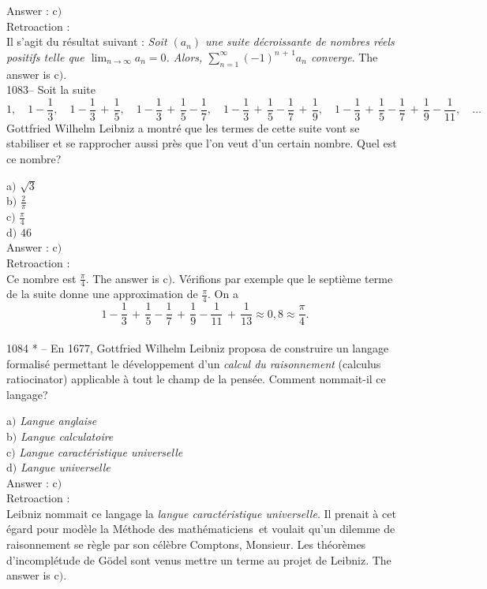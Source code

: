 ﻿\documentclass[letterpaper, 12pt]{article}
\begin{document}
Answer : c$)$\\

Retroaction : \\
Il s'agit du r\'esultat suivant : {\sl Soit $(a_n)$ une suite
d\'ecroissante de nombres r\'eels positifs telle que
$\lim_{n\to\infty}a_n=0$. Alors,
$\sum_{n=1}^{\infty}(-1)^{n\,+\,1}a_n$ converge}.
The answer is c$)$.\\

1083-- Soit la suite
$$\displaystyle{1,\quad1-\frac13,\quad1-\frac13\,+\,\frac15,\quad1-\frac13\,+\,\frac15-\frac17,\quad1-\frac13\,+\,\frac15-\frac17\,+\,\frac19,\quad
1-\frac13\,+\,\frac15-\frac17\,+\,\frac19-\frac1{11},\quad\ldots}$$
Gottfried Wilhelm Leibniz a montr\'e que les termes de cette suite
vont se stabiliser et se rapprocher aussi pr\`es que l'on veut d'un
certain nombre. Quel est ce nombre?

a$)$ $\sqrt3$ \\ [2mm] b$)$ $\frac2{\pi}$ \\ [2mm] c$)$
$\frac{\pi}4$ \\ [2mm]
d$)$ $46$\\

Answer : c$)$\\

Retroaction : \\
Ce nombre est $\frac{\pi}4$. The answer is c$)$. V\'erifions par
exemple que le septi\`eme terme de la suite donne une approximation
de $\frac{\pi}4$. On a
$$1-\frac13\,+\,\frac15-\frac17\,+\,\frac19-\frac1{11}\,+\,\frac1{13}\approx0,8\approx\frac{\pi}4.$$
\\

1084 * -- En 1677, Gottfried Wilhelm Leibniz proposa de construire
un langage formalis\'e permettant le d\'eveloppement d'un {\sl
calcul du raisonnement} (\og calculus ratiocinator\fg) applicable
\`a tout le champ de la pens\'ee. Comment nommait-il ce langage?

a$)$ {\sl Langue anglaise} \\
b$)$ {\sl Langue calculatoire} \\
c$)$ {\sl Langue caract\'eristique universelle} \\
d$)$ {\sl Langue universelle}\\

Answer : c$)$\\

Retroaction :\\
Leibniz nommait ce langage la {\sl langue caract\'eristique
universelle}. Il prenait \`a cet \'egard pour mod\`ele la \og
M\'ethode des math\'ematiciens\fg\ et voulait qu'un dilemme de
raisonnement se r\`egle par son c\'el\`ebre \og Comptons,
Monsieur\fg . Les th\'eor\`emes d'incompl\'etude de G\"odel sont
venus mettre un terme au projet de Leibniz.
The answer is c$)$.\\
\end{document}
